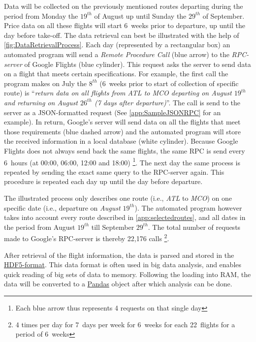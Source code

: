 Data will be collected on the previously mentioned routes departing during the period from Monday the $19^{th}$ of August up until Sunday the $29^{th}$ of September. Price data on all these flights will start 6~weeks prior to departure, up until the day before take-off. The data retrieval can best be illustrated with the help of \autoref{fig:DataRetrievalProcess}. Each day (represented by a rectangular box) an automated program will send a \emph{Remote Procedure Call} (blue arrow) to the \emph{RPC-server} of Google Flights (blue cylinder). This request asks the server to send data on a flight that meets certain specifications. For example, the first call the program makes on July the $8^{th}$ (6~weeks prior to start of collection of specific route) is ``\emph{return data on all flights from ATL to MCO departing on August $19^{th}$ and returning on August $26^{th}$ (7 days after departure)}''. The call is send to the server as a JSON-formatted request (See \autoref{app:SampleJSONRPC} for an example). In return, Google's server will send data on all the flights that meet those requirements (blue dashed arrow) and the automated program will store the received information in a local database (white cylinder). Because Google Flights does not always send back the same flights, the same RPC is send every 6~hours (at 00:00, 06:00, 12:00 and 18:00) \footnote{Each blue arrow thus represents 4 requests on that single day}. The next day the same process is repeated by sending the exact same query to the RPC-server again. This procedure is repeated each day up until the day before departure.

The illustrated process only describes one route (i.e., \emph{ATL} to \emph{MCO}) on one specific date (i.e., departure on \emph{August $19^{th}$}). The automated program however takes into account every route described in \autoref{app:selectedroutes}, and all dates in the period from August $19^{th}$ till September $29^{th}$. The total number of requests made to Google's RPC-server is thereby 22,176 calls \footnote{4 times per day for 7~days per week for 6~weeks for each 22~flights for a period of 6~weeks}.

After retrieval of the flight information, the data is parsed and stored in the \href{http://www.hdfgroup.org/HDF5/}{HDF5-format}. This data format is often used in big data analysis, and enables quick reading of big sets of data to memory. Following the loading into RAM, the data will be converted to a \href{http://pandas.pydata.org/}{Pandas} object after which analysis can be done.

